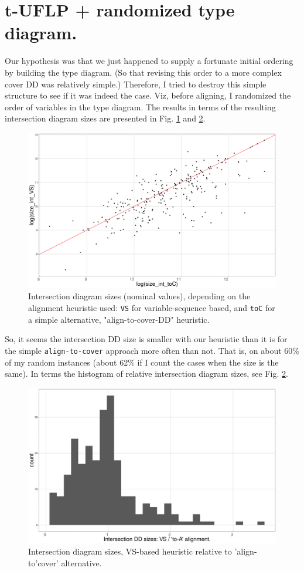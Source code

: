 \documentclass[11pt]{article}
\begin{document}
\section{t-UFLP + randomized type diagram.}
\label{sec:org167a6ba}
Our hypothesis was that we just happened to supply a fortunate initial
ordering by building the type diagram. (So that revising this order to a more
complex cover DD was relatively simple.) Therefore, I tried to destroy this
simple structure to see if it was indeed the case. Viz, before aligning, I
randomized the order of variables in the type diagram. The results in terms of
the resulting intersection diagram sizes are presented in Fig.
\ref{fig:intrndpts} and \ref{fig:intrndhist}.

\begin{figure}[htbp]
\centering
\includegraphics[width=0.8\linewidth]{./int_sizes_points.png}
\caption{\label{fig:intrndpts}Intersection diagram sizes (nominal values), depending on the alignment heuristic used: \texttt{VS} for variable-sequence based, and \texttt{toC} for a simple alternative, "align-to-cover-DD" heuristic.}
\end{figure}

So, it seems the intersection DD size is smaller with our heuristic than it is
for the simple \texttt{align-to-cover} approach more often than not. That is, on about
60\% of my random instances (about 62\% if I count the cases when the size is the
same). In terms the histogram of relative intersection diagram sizes, see Fig.
\ref{fig:intrndhist}.

\begin{figure}[htbp]
\centering
\includegraphics[width=0.8\linewidth]{./int_sizes_hist.png}
\caption{\label{fig:intrndhist}Intersection diagram sizes, VS-based heuristic relative to 'align-to'cover' alternative.}
\end{figure}
\end{document}

